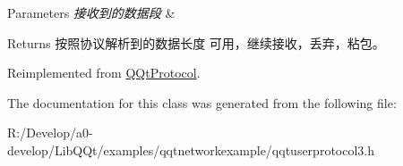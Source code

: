 \begin{DoxyParams}{Parameters}
{\em 接收到的数据段} & \\
\hline
\end{DoxyParams}
\begin{DoxyReturn}{Returns}
按照协议解析到的数据长度 可用，继续接收，丢弃，粘包。 
\end{DoxyReturn}


Reimplemented from \mbox{\hyperlink{class_q_qt_protocol_a00fd0c1ac23379ed3b9b25da9a34f39b}{Q\+Qt\+Protocol}}.



The documentation for this class was generated from the following file\+:\begin{DoxyCompactItemize}
\item 
R\+:/\+Develop/a0-\/develop/\+Lib\+Q\+Qt/examples/qqtnetworkexample/qqtuserprotocol3.\+h\end{DoxyCompactItemize}
